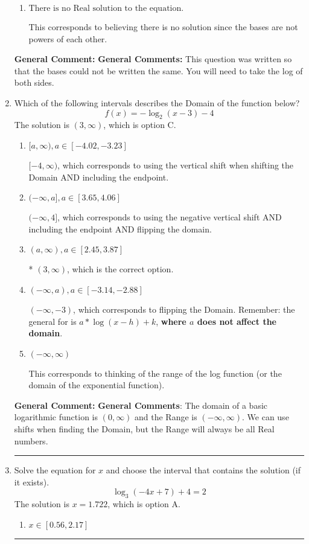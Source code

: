 \documentclass{extbook}[14pt]
\newcommand{\litem}[1]{\item #1

\rule{\textwidth}{0.4pt}}
\begin{document}
\begin{enumerate}
{\begin{enumerate}[label=\Alph*.]
* $x = 15.397$, which is the correct option.
\item \( \text{There is no Real solution to the equation.} \)

This corresponds to believing there is no solution since the bases are not powers of each other.
\end{enumerate}

\textbf{General Comment:} \textbf{General Comments:} This question was written so that the bases could not be written the same. You will need to take the log of both sides.
}
\litem{
Which of the following intervals describes the Domain of the function below?
\[ f(x) = -\log_2{(x-3)}-4 \]The solution is \( (3, \infty) \), which is option C.\begin{enumerate}[label=\Alph*.]
\item \( [a, \infty), a \in [-4.02, -3.23] \)

$[-4, \infty)$, which corresponds to using the vertical shift when shifting the Domain AND including the endpoint.
\item \( (-\infty, a], a \in [3.65, 4.06] \)

$(-\infty, 4]$, which corresponds to using the negative vertical shift AND including the endpoint AND flipping the domain.
\item \( (a, \infty), a \in [2.45, 3.87] \)

* $(3, \infty)$, which is the correct option.
\item \( (-\infty, a), a \in [-3.14, -2.88] \)

$(-\infty, -3)$, which corresponds to flipping the Domain. Remember: the general for is $a*\log(x-h)+k$, \textbf{where $a$ does not affect the domain}.
\item \( (-\infty, \infty) \)

This corresponds to thinking of the range of the log function (or the domain of the exponential function).
\end{enumerate}

\textbf{General Comment:} \textbf{General Comments}: The domain of a basic logarithmic function is $(0, \infty)$ and the Range is $(-\infty, \infty)$. We can use shifts when finding the Domain, but the Range will always be all Real numbers.
}
\litem{
Solve the equation for $x$ and choose the interval that contains the solution (if it exists).
\[ \log_{3}{(-4x+7)}+4 = 2 \]The solution is \( x = 1.722 \), which is option A.\begin{enumerate}[label=\Alph*.]
\item \( x \in [0.56, 2.17] \)


\end{enumerate}}
\end{enumerate}
\end{document}
